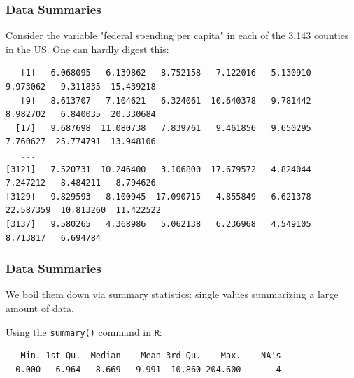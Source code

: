 \documentclass[handout]{beamer}
\newcommand{\blue}[1]{\textcolor{blue2}{#1}}
\begin{document}
\begin{frame}[fragile]
\frametitle{Data Summaries}

Consider the variable "federal spending per capita" in each of the 3,143 counties in the US.  One can hardly digest this:

\begin{tiny}
\begin{verbatim}
   [1]   6.068095   6.139862   8.752158   7.122016   5.130910   9.973062   9.311835  15.439218
   [9]   8.613707   7.104621   6.324061  10.640378   9.781442   8.982702   6.840035  20.330684
  [17]   9.687698  11.080738   7.839761   9.461856   9.650295   7.760627  25.774791  13.948106
   ...
[3121]   7.520731  10.246400   3.106800  17.679572   4.824044   7.247212   8.484211   8.794626
[3129]   9.829593   8.100945  17.090715   4.855849   6.621378  22.587359  10.813260  11.422522
[3137]   9.580265   4.368986   5.062138   6.236968   4.549105   8.713817   6.694784
\end{verbatim}
\end{tiny}

\end{frame}




\begin{frame}[fragile]
\frametitle{Data Summaries}
We boil them down via \blue{summary statistics}: single values summarizing a large amount of data.

\vspace{0.5cm}

\pause Using the \verb#summary()# command in \verb#R#:

\begin{small}
\begin{verbatim}
   Min. 1st Qu.  Median    Mean 3rd Qu.    Max.    NA's 
  0.000   6.964   8.669   9.991  10.860 204.600       4 
\end{verbatim}
\end{small}


\end{frame}
\end{document}
